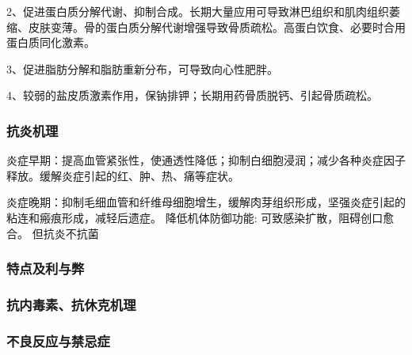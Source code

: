 \documentclass[UTF8]{ctexbook}
\begin{document}
2、促进蛋白质分解代谢、抑制合成。长期大量应用可导致淋巴组织和肌肉组织萎缩、皮肤变薄。骨的蛋白质分解代谢增强导致骨质疏松。高蛋白饮食、必要时合用蛋白质同化激素。

3、促进脂肪分解和脂肪重新分布，可导致向心性肥胖。

4、较弱的盐皮质激素作用，保钠排钾；长期用药骨质脱钙、引起骨质疏松。
\subsubsection{抗炎机理}
炎症早期：提高血管紧张性，使通透性降低；抑制白细胞浸润；减少各种炎症因子释放。缓解炎症引起的红、肿、热、痛等症状。

炎症晚期：抑制毛细血管和纤维母细胞增生，缓解肉芽组织形成，坚强炎症引起的粘连和瘢痕形成，减轻后遗症。
降低机体防御功能: 可致感染扩散，阻碍创口愈合。 但抗炎不抗菌
\subsubsection{特点及利与弊}
\subsubsection{抗内毒素、抗休克机理}
\subsubsection{不良反应与禁忌症}
\end{document}
